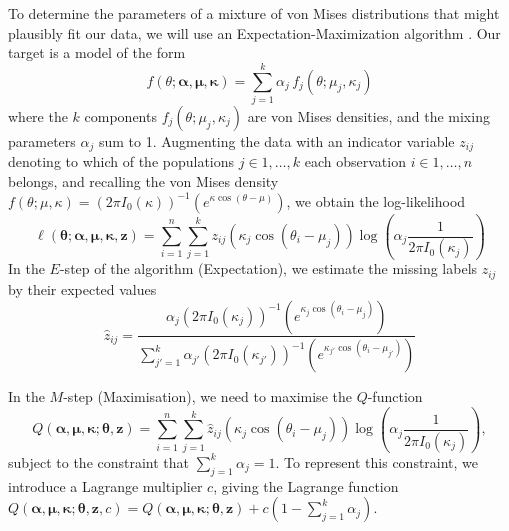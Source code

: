 \documentclass[../../ArchStats.tex]{subfiles}
\begin{document}
To determine the parameters of a mixture of von Mises distributions that might plausibly fit our data, we will use an Expectation-Maximization algorithm \cite{Chang-Chien2012}. Our target is a model of the form
\begin{equation}
f(\theta; \boldsymbol{\alpha, \mu, \kappa}) = \sum_{j=1}^k \alpha_j \, f_j(\theta; \mu_j, \kappa_j)
\end{equation}
where the $k$ components $f_j(\theta; \mu_j, \kappa_j)$  are von Mises densities, and the mixing parameters $\alpha_j$ sum to 1. Augmenting the data with an indicator variable $z_{ij}$ denoting to which of the populations $j \in {1, \dots, k}$ each observation $i \in {1, \dots, n}$ belongs, and recalling the von Mises density $f(\theta; \mu, \kappa) = (2\pi I_0(\kappa))^{-1}(e^{\kappa \cos(\theta - \mu)})$, we obtain the log-likelihood
\begin{equation}
\ell(\boldsymbol{\theta}; \boldsymbol{\alpha, \mu, \kappa, z}) = \sum_{i=1}^n \sum_{j=1}
^k z_{ij} \left(\kappa_j \cos(\theta_i - \mu_j)  \right) \log \left( \alpha_j  \frac{1}{2\pi I_0(\kappa_j)} \right)
\end{equation}
In the $E$-step  of the algorithm (Expectation), we estimate the missing labels $z_{ij}$ by their expected values
\begin{equation}
\label{eq:EM-z}
\hat{z}_{ij} = \frac{\alpha_j (2\pi I_0(\kappa_j))^{-1}(e^{\kappa_j \cos(\theta_i - \mu_j)})}{\sum_{j'=1}^k \alpha_{j'} (2\pi I_0(\kappa_{j'}))^{-1}(e^{\kappa_{j'} \cos(\theta_i - \mu_{j'})})} 
\end{equation}

In the $M$-step (Maximisation), we need to maximise the $Q$-function
\begin{equation}
Q(\boldsymbol{\alpha, \mu, \kappa}; \boldsymbol{\theta, z}) = \sum_{i=1}^n \sum_{j=1}
^k \hat{z}_{ij} \left(\kappa_j \cos(\theta_i - \mu_j)  \right) \log \left( \alpha_j  \frac{1}{2\pi I_0(\kappa_j)} \right),
\end{equation}
subject to the constraint that $\sum_{j=1}^k \alpha_j = 1$. To represent this constraint, we introduce a Lagrange multiplier $c$, giving the Lagrange function $Q(\boldsymbol{\alpha, \mu, \kappa}; \boldsymbol{\theta, z}, c) = Q(\boldsymbol{\alpha, \mu, \kappa}; \boldsymbol{\theta, z}) + c \left(1 - \sum_{j=1}^k \alpha_j \right)$. 
\end{document}
